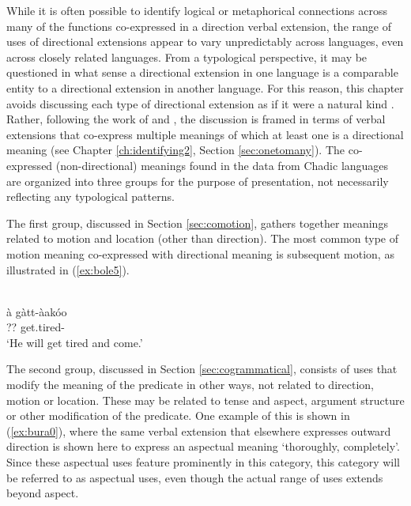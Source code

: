 While it is often possible to identify logical or metaphorical connections across many of the functions co-expressed in a direction verbal extension, the range of uses of directional extensions appear to vary unpredictably across languages, even across closely related languages. From a typological perspective, it may be questioned in what sense a directional extension in one language is a comparable entity to a directional extension in another language. For this reason, this chapter avoids discussing each type of directional extension as if it were a natural kind \citep[see][]{haspelmathHowComparativeConcepts2018}. Rather, following the work of \citet{francoisSemanticMapsTypology2008} and \citet{hartmannIdentifyingSemanticRole2016}, the discussion is framed in terms of verbal extensions that co-express multiple meanings of which at least one is a directional meaning (see Chapter \ref{ch:identifying2}, Section \ref{sec:onetomany}). The co-expressed (non-directional) meanings found in the data from Chadic languages are organized into three groups for the purpose of presentation, not necessarily reflecting any typological patterns. 

The first group, discussed in Section \ref{sec:comotion}, gathers together meanings related to motion and location (other than direction). The most common type of motion meaning co-expressed with directional meaning is subsequent motion, as illustrated in (\ref{ex:bole5}).

\ea\label{ex:bole5}
 \\
\gll à gàtt-àakóo \\
?? get.tired- \\
\glt `He will get tired and come.'
\z

The second group, discussed in Section \ref{sec:cogrammatical}, consists of uses that modify the meaning of the predicate in other ways, not related to direction, motion or location. These may be related to tense and aspect, argument structure or other modification of the predicate. One example of this is shown in (\ref{ex:bura0}), where the same verbal extension that elsewhere expresses outward direction is shown here to express an aspectual meaning `thoroughly, completely'. Since these aspectual uses feature prominently in this category, this category will be referred to as aspectual uses, even though the actual range of uses extends beyond aspect. 

